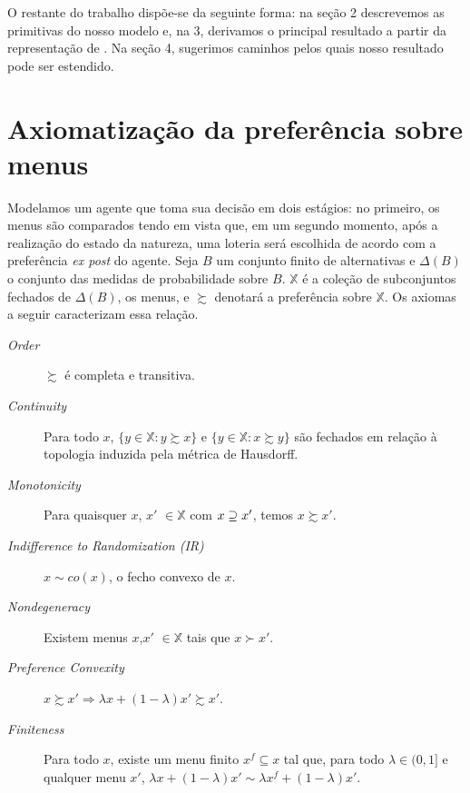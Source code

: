 \documentclass[11pt, a4paper]{article}
\theoremstyle{nonumberplain}
\theoremstyle{plain}
\theoremstyle{plain}
\theoremstyle{plain}
\begin{document}
O restante do trabalho dispõe-se da seguinte forma: na seção 2 descrevemos as primitivas do nosso modelo e, na 3, derivamos o principal resultado a partir da representação de \cite{Kochov2007}. Na seção 4, sugerimos caminhos pelos quais nosso resultado pode ser estendido. 

\section{Axiomatização da preferência sobre menus}
Modelamos um agente que toma sua decisão em dois estágios: no primeiro, os menus são comparados tendo em vista que, em um segundo momento, após a realização do estado da natureza, uma loteria será escolhida de acordo com a preferência \emph{ex post} do agente.  
Seja $B$ um conjunto finito de alternativas e $\Delta(B)$ o conjunto das medidas de probabilidade sobre $B$. $\mathbb{X}$ é a coleção de subconjuntos fechados de $\Delta(B)$, os menus, e $\succsim$ denotará a preferência sobre $\mathbb{X}$. Os axiomas a seguir caracterizam essa relação.
\begin{description}
\item [\textit{Order}] $\succsim$ é completa e transitiva.  
\item [\textit{Continuity}] Para todo $x$, $\{y\in \mathbb{X}:y\succsim x\}$ e $\{y\in \mathbb{X}:x\succsim y\}$ são fechados em relação à topologia induzida pela métrica de Hausdorff.%
\item [\textit{Monotonicity}] Para quaisquer $x$, $x'$ $\in\mathbb{X}$ com $x\begin{small}\supseteq\end{small} x'$, temos $x\succsim x'$. 
\item [\textit{Indifference to Randomization (IR)}] $x\sim co(x)$, o fecho convexo de $x$. 
\item [\textit{Nondegeneracy}] Existem menus $x$,$x'$ $\in \mathbb{X}$ tais que $x\succ x'$.
\item [\textit{Preference Convexity}] $x\succsim x' \Rightarrow \lambda x +(1-\lambda)x'\succsim x'$.
\item[\textit{Finiteness}] Para todo $x$, existe um menu finito $x^f\subseteq x$ tal que, para todo $\lambda\in (0,1]$ e qualquer menu $x'$, $\lambda x +(1-\lambda)x' \sim \lambda x^f +(1-\lambda)x'$.
\end{description}  
\end{document}
